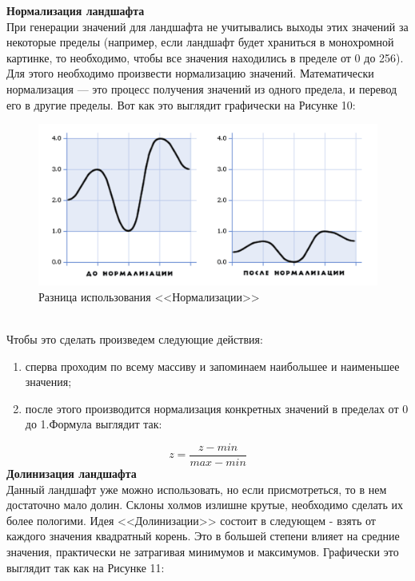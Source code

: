 \documentclass[a4paper, 10pt]{article}
\begin{document}
	\textbf{Нормализация ландшафта}
	\\ \hspace*{5mm}При генерации значений для ландшафта не учитывались выходы этих значений за некоторые пределы (например, если ландшафт будет храниться в монохромной картинке, то необходимо, чтобы все значения находились в пределе от 0 до 256). Для этого необходимо произвести нормализацию значений. Математически нормализация — это процесс получения значений из одного предела, и перевод его в другие пределы. Вот как это выглядит графически на Рисунке 10:
	\begin{figure}[h!]
		\centering
		\includegraphics[scale=0.9]{normal}
		\centering\caption{Разница использования <<Нормализации>>}
	\end{figure}
	\\ Чтобы это сделать произведем следующие действия:
	 \begin{enumerate}
	 	\item сперва проходим по всему массиву и запоминаем наибольшее и наименьшее значения;
	 	\item после этого производится нормализация конкретных значений в пределах от 0 до 1.Формула  выглядит так:
	 \end{enumerate}
  	\begin{equation}
  		z = \frac{z - min}{max - min}
  	\end{equation}
  \clearpage
  \newpage
  \textbf{Долинизация ландшафта}
  \\ \hspace*{5mm} Данный ландшафт уже можно использовать, но если присмотреться, то в нем достаточно мало долин. Склоны холмов излишне крутые, необходимо сделать их более пологими. Идея <<Долинизации>> состоит в следующем - взять от каждого значения квадратный корень. Это в большей степени влияет на средние значения, практически не затрагивая минимумов и максимумов. Графически это выглядит так как на Рисунке 11:
\end{document}
